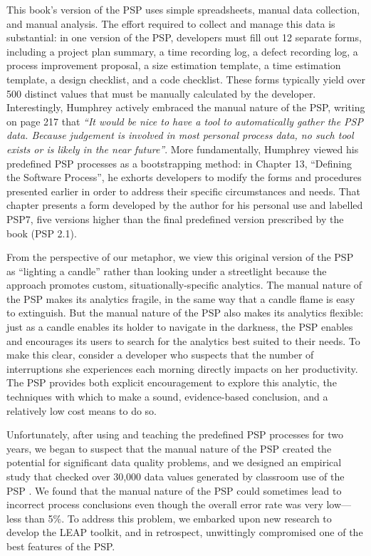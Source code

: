 \documentclass[]{article}
\begin{document}
This book's version of the PSP uses simple spreadsheets, manual data collection, and
manual analysis. The effort required to collect and manage this data is substantial: in
one version of the PSP, developers must fill out 12 separate forms, including a project
plan summary, a time recording log, a defect recording log, a process improvement
proposal, a size estimation template, a time estimation template, a design checklist, and
a code checklist. These forms typically yield over 500 distinct values that must be
manually calculated by the developer.  Interestingly, Humphrey actively embraced the
manual nature of the PSP, writing on page 217 that {\em ``It would be nice to have a tool
  to automatically gather the PSP data. Because judgement is involved in most personal
  process data, no such tool exists or is likely in the near future''}.  More
fundamentally, Humphrey viewed his predefined PSP processes as a
bootstrapping method: in Chapter 13, ``Defining the Software Process'', he exhorts
developers to modify the forms and procedures presented earlier in order to address their
specific circumstances and needs. That chapter presents a form developed by the author for
his personal use and labelled PSP7, five versions higher than the final predefined version prescribed
by the book (PSP 2.1).

From the perspective of our metaphor, we view this original version of the PSP as
``lighting a candle'' rather than looking under a streetlight because the approach promotes
custom, situationally-specific analytics. The manual nature of the PSP makes its analytics
fragile, in the same way that a candle flame is easy to extinguish.  But the manual nature
of the PSP also makes its analytics flexible: just as a candle enables its holder to
navigate in the darkness, the PSP enables and encourages its users to search for the
analytics best suited to their needs.  To make this clear, consider a developer who
suspects that the number of interruptions she experiences each morning directly impacts on
her productivity.  The PSP provides both explicit encouragement to explore this analytic,
the techniques with which to make a sound, evidence-based conclusion, and a relatively low cost
means to do so.  

Unfortunately, after using and teaching the predefined PSP processes for two years, we
began to suspect that the manual nature of the PSP created the potential for significant
data quality problems, and we designed an empirical study that 
checked over 30,000 data values generated by classroom use of the PSP
\cite{csdl-98-11}. We found that the manual nature of the PSP could sometimes lead to
incorrect process conclusions even though the overall error rate was very low---less than
5\%.  To address this problem, we embarked upon new research to develop the
LEAP toolkit, and in retrospect, unwittingly compromised one of the best features of the PSP.
\end{document}
